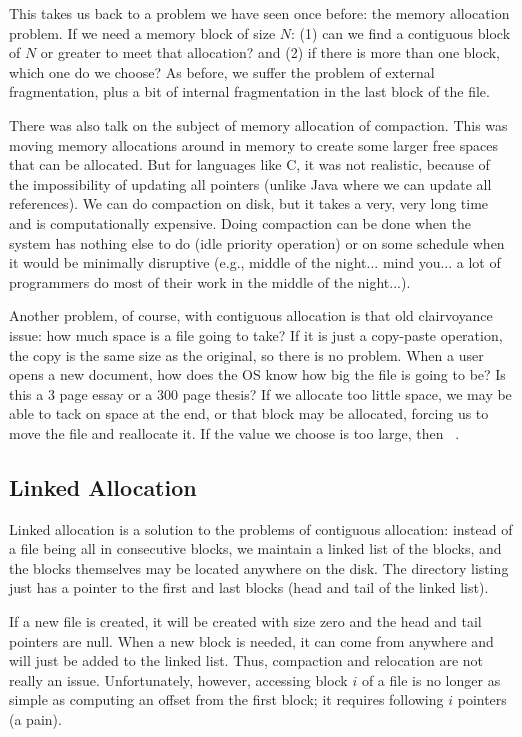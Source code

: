 This takes us back to a problem we have seen once before: the memory allocation problem. If we need a memory block of size $N$: (1) can we find a contiguous block of $N$ or greater to meet that allocation? and (2) if there is more than one block, which one do we choose? As before, we suffer the problem of external fragmentation, plus a bit of internal fragmentation in the last block of the file. 

There was also talk on the subject of memory allocation of compaction. This was moving memory allocations around in memory to create some larger free spaces that can be allocated. But for languages like C, it was not realistic, because of the impossibility of updating all pointers (unlike Java where we can update all references). We can do compaction on disk, but it takes a very, very long time and is computationally expensive. Doing compaction can be done when the system has nothing else to do (idle priority operation) or on some schedule when it would be minimally disruptive (e.g., middle of the night... mind you... a lot of programmers do most of their work in the middle of the night...).

Another problem, of course, with contiguous allocation is that old clairvoyance issue: how much space is a file going to take? If it is just a copy-paste operation, the copy is the same size as the original, so there is no problem. When a user opens a new document, how does the OS know how big the file is going to be? Is this a 3 page essay or a 300 page thesis? If we allocate too little space, we may be able to tack on space at the end, or that block may be allocated, forcing us to move the file and reallocate it. If the value we choose is too large, then  ~\cite{osc}. %

\subsection*{Linked Allocation}
Linked allocation is a solution to the problems of contiguous allocation: instead of a file being all in consecutive blocks, we maintain a linked list of the blocks, and the blocks themselves may be located anywhere on the disk. The directory listing just has a pointer to the first and last blocks (head and tail of the linked list).

If a new file is created, it will be created with size zero and the head and tail pointers are null. When a new block is needed, it can come from anywhere and will just be added to the linked list. Thus, compaction and relocation are not really an issue. Unfortunately, however, accessing block $i$ of a file is no longer as simple as computing an offset from the first block; it requires following $i$ pointers (a pain).

